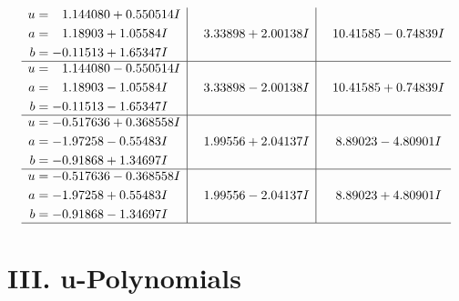 \documentclass[1p]{elsarticle_modified}
\theoremstyle{definition}
\begin{document}
$$\begin{array}{c|c|c}
\begin{aligned}
u &= \phantom{-}1.144080 + 0.550514 I \\
a &= \phantom{-}1.18903 + 1.05584 I \\
b &= -0.11513 + 1.65347 I\end{aligned}
 & \phantom{-}3.33898 + 2.00138 I & \phantom{-}10.41585 - 0.74839 I \\ \hline\begin{aligned}
u &= \phantom{-}1.144080 - 0.550514 I \\
a &= \phantom{-}1.18903 - 1.05584 I \\
b &= -0.11513 - 1.65347 I\end{aligned}
 & \phantom{-}3.33898 - 2.00138 I & \phantom{-}10.41585 + 0.74839 I \\ \hline\begin{aligned}
u &= -0.517636 + 0.368558 I \\
a &= -1.97258 - 0.55483 I \\
b &= -0.91868 + 1.34697 I\end{aligned}
 & \phantom{-}1.99556 + 2.04137 I & \phantom{-}8.89023 - 4.80901 I \\ \hline\begin{aligned}
u &= -0.517636 - 0.368558 I \\
a &= -1.97258 + 0.55483 I \\
b &= -0.91868 - 1.34697 I\end{aligned}
 & \phantom{-}1.99556 - 2.04137 I & \phantom{-}8.89023 + 4.80901 I\\
 \hline 
 \end{array}$$\newpage
\newpage\renewcommand{\arraystretch}{1}
\centering \section*{ III. u-Polynomials}
\end{document}
